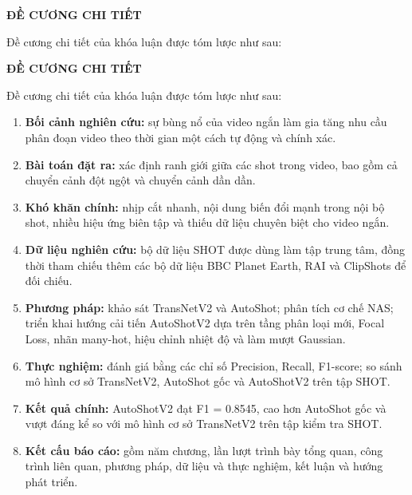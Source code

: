 {}

\begin{center}
{\large\bfseries{ĐỀ CƯƠNG CHI TIẾT}}
\end{center}

Đề cương chi tiết của khóa luận được tóm lược như sau:
{}

\begin{center}
{\large\bfseries{ĐỀ CƯƠNG CHI TIẾT}}
\end{center}

Đề cương chi tiết của khóa luận được tóm lược như sau:

\begin{enumerate}
    \item \textbf{Bối cảnh nghiên cứu:} sự bùng nổ của video ngắn làm gia tăng nhu cầu phân đoạn video theo thời gian một cách tự động và chính xác.
    \item \textbf{Bài toán đặt ra:} xác định ranh giới giữa các shot trong video, bao gồm cả chuyển cảnh đột ngột và chuyển cảnh dần dần.
    \item \textbf{Khó khăn chính:} nhịp cắt nhanh, nội dung biến đổi mạnh trong nội bộ shot, nhiều hiệu ứng biên tập và thiếu dữ liệu chuyên biệt cho video ngắn.
    \item \textbf{Dữ liệu nghiên cứu:} bộ dữ liệu SHOT được dùng làm tập trung tâm, đồng thời tham chiếu thêm các bộ dữ liệu BBC Planet Earth, RAI và ClipShots để đối chiếu.
    \item \textbf{Phương pháp:} khảo sát TransNetV2 và AutoShot; phân tích cơ chế NAS; triển khai hướng cải tiến AutoShotV2 dựa trên tầng phân loại mới, Focal Loss, nhãn many-hot, hiệu chỉnh nhiệt độ và làm mượt Gaussian.
    \item \textbf{Thực nghiệm:} đánh giá bằng các chỉ số Precision, Recall, F1-score; so sánh mô hình cơ sở TransNetV2, AutoShot gốc và AutoShotV2 trên tập SHOT.
    \item \textbf{Kết quả chính:} AutoShotV2 đạt F1 = 0.8545, cao hơn AutoShot gốc và vượt đáng kể so với mô hình cơ sở TransNetV2 trên tập kiểm tra SHOT.
    \item \textbf{Kết cấu báo cáo:} gồm năm chương, lần lượt trình bày tổng quan, công trình liên quan, phương pháp, dữ liệu và thực nghiệm, kết luận và hướng phát triển.
\end{enumerate}
